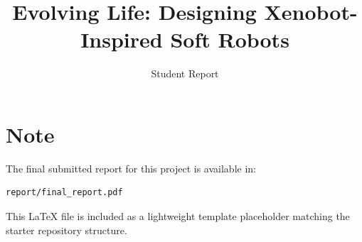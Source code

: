 \documentclass[11pt]{article}
\title{Evolving Life: Designing Xenobot-Inspired Soft Robots}
\author{Student Report}
\date{}
\begin{document}
\maketitle

\section*{Note}
The final submitted report for this project is available in:
\begin{verbatim}
report/final_report.pdf
\end{verbatim}

This LaTeX file is included as a lightweight template placeholder matching the
starter repository structure.
\end{document}
